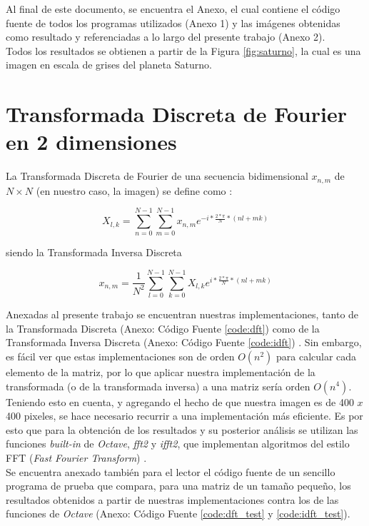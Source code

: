 \documentclass[twocolumn,a4paper,10pt]{article}
\begin{document}
Al final de este documento, se encuentra el Anexo, el cual contiene el c\'odigo fuente de todos los programas utilizados (Anexo 1) y 
las im\'agenes obtenidas como resultado y referenciadas a lo largo del presente trabajo (Anexo 2).\\

Todos los resultados se obtienen a partir de la Figura \ref{fig:saturno}, la cual es una imagen en escala de grises del planeta Saturno. \\

\section{Transformada Discreta de Fourier en 2 dimensiones}
\label{sec:defDFT}
La Transformada Discreta de Fourier de una secuencia bidimensional $x_{n,m}$ de $N \times N$ (en nuestro caso, la imagen) 
se define como \cite{Guia2-MNA} \cite{NumericalRecipes}:

\begin{equation}
    X_{l,k} = \sum_{n=0}^{N - 1} \sum_{m=0}^{N - 1} x_{n,m} e^{-i*\frac{2*\pi}{N}*(nl + mk)}
\end{equation}

siendo la Transformada Inversa Discreta

\begin{equation}
    x_{n,m} = \frac{1}{N^2} \sum_{l=0}^{N - 1} \sum_{k=0}^{N - 1} X_{l,k} e^{i*\frac{2*\pi}{N}*(nl + mk)}
\end{equation}

Anexadas al presente trabajo se encuentran nuestras implementaciones, tanto de la Transformada Discreta (Anexo: C\'odigo Fuente \ref{code:dft}) como de
 la Transformada Inversa Discreta (Anexo: C\'odigo Fuente \ref{code:idft}) . 
Sin embargo, es f\'acil ver que estas 
implementaciones son de orden $O(n^2)$ para calcular cada elemento de la matriz, por lo que aplicar nuestra implementaci\'on de la 
transformada (o de la transformada inversa) a una matriz ser\'ia orden $O(n^4)$. Teniendo esto en cuenta, y agregando el hecho de que nuestra imagen es de 400 $x$ 400 
pixeles, se hace necesario recurrir a una implementaci\'on m\'as eficiente. Es por esto que para la obtenci\'on de los resultados y su posterior an\'alisis 
se utilizan las funciones \textit{built-in} de \textit{Octave}, \textit{fft2} y \textit{ifft2}, que implementan algoritmos del estilo FFT 
(\textit{Fast Fourier Transform}) \cite{Wikipedia_FFT}.\\

Se encuentra anexado también para el lector el c\'odigo fuente de un sencillo programa de prueba que compara, para una matriz de un tamaño pequeño, 
los resultados obtenidos a  partir de nuestras implementaciones contra los de las funciones de \textit{Octave}
(Anexo: C\'odigo Fuente \ref{code:dft_test} y \ref{code:idft_test}). \\
\end{document}
